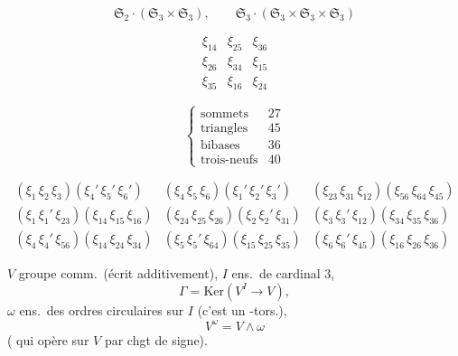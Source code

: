 \documentclass[11pt,a4paper]{article}
\begin{document}
\[
\mathfrak{S}_2 \cdot (\mathfrak{S}_3 \times \mathfrak{S}_3), \qquad
\mathfrak{S}_3 \cdot (\mathfrak{S}_3 \times \mathfrak{S}_3 \times \mathfrak{S}_3)
\]

\[
\begin{matrix}
\xi_{14} & \xi_{25} & \xi_{36}\\
\xi_{26} & \xi_{34} & \xi_{15}\\
\xi_{35} & \xi_{16} & \xi_{24}
\end{matrix}
\]

\[
\left\{
\begin{array}{ll}
\text{sommets} & 27\\
\text{triangles} & 45\\
\text{bibases} & 36\\
\text{trois-neufs} & 40
\end{array}
\right.
\]


\[
\begin{array}{lll}
(\xi_1\,\xi_2\,\xi_3)(\xi_4'\,\xi_5'\,\xi_6') & (\xi_4\,\xi_5\,\xi_6)(\xi_1'\,\xi_2'\,\xi_3') & (\xi_{23}\,\xi_{31}\,\xi_{12})(\xi_{56}\,\xi_{64}\,\xi_{45})\\[4pt]
(\xi_1\,\xi_1'\,\xi_{23})(\xi_{14}\,\xi_{15}\,\xi_{16}) & (\xi_{24}\,\xi_{25}\,\xi_{26})(\xi_2\,\xi_2'\,\xi_{31}) & (\xi_3\,\xi_3'\,\xi_{12})(\xi_{34}\,\xi_{35}\,\xi_{36})\\[4pt]
(\xi_4\,\xi_4'\,\xi_{56})(\xi_{14}\,\xi_{24}\,\xi_{34}) & (\xi_5\,\xi_5'\,\xi_{64})(\xi_{15}\,\xi_{25}\,\xi_{35}) & (\xi_6\,\xi_6'\,\xi_{45})(\xi_{16}\,\xi_{26}\,\xi_{36})
\end{array}
\]

$V$ groupe comm.\ (écrit additivement), $I$ ens.\ de cardinal $3$,
\[
\Gamma = \mathrm{Ker}(V^I \to V),
\]
$\omega$ ens.\ des  ordres circulaires sur $I$ (c'est un  -tors.),
\[
V^\omega = V \wedge \omega
\]
(  qui opère sur $V$ par chgt de signe).
\end{document}
